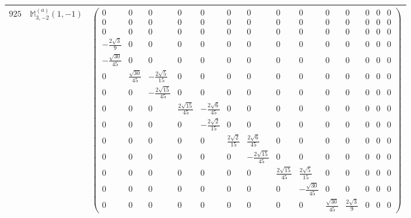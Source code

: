 \documentclass[fleqn,8pt,landscape]{jsarticle}
\begin{document}
\begin{center}
\begin{longtable}{ccc}
$ 925 $ & $ \mathbb{M}_{3,-2}^{(a)}(1,-1) $ & $ \begin{pmatrix} 0 & 0 & 0 & 0 & 0 & 0 & 0 & 0 & 0 & 0 & 0 & 0 & 0 & 0 \\ 0 & 0 & 0 & 0 & 0 & 0 & 0 & 0 & 0 & 0 & 0 & 0 & 0 & 0 \\ 0 & 0 & 0 & 0 & 0 & 0 & 0 & 0 & 0 & 0 & 0 & 0 & 0 & 0 \\ - \frac{2 \sqrt{3}}{9} & 0 & 0 & 0 & 0 & 0 & 0 & 0 & 0 & 0 & 0 & 0 & 0 & 0 \\ - \frac{\sqrt{30}}{45} & 0 & 0 & 0 & 0 & 0 & 0 & 0 & 0 & 0 & 0 & 0 & 0 & 0 \\ 0 & \frac{\sqrt{30}}{45} & - \frac{2 \sqrt{5}}{15} & 0 & 0 & 0 & 0 & 0 & 0 & 0 & 0 & 0 & 0 & 0 \\ 0 & 0 & - \frac{2 \sqrt{15}}{45} & 0 & 0 & 0 & 0 & 0 & 0 & 0 & 0 & 0 & 0 & 0 \\ 0 & 0 & 0 & \frac{2 \sqrt{15}}{45} & - \frac{2 \sqrt{6}}{45} & 0 & 0 & 0 & 0 & 0 & 0 & 0 & 0 & 0 \\ 0 & 0 & 0 & 0 & - \frac{2 \sqrt{2}}{15} & 0 & 0 & 0 & 0 & 0 & 0 & 0 & 0 & 0 \\ 0 & 0 & 0 & 0 & 0 & \frac{2 \sqrt{2}}{15} & \frac{2 \sqrt{6}}{45} & 0 & 0 & 0 & 0 & 0 & 0 & 0 \\ 0 & 0 & 0 & 0 & 0 & 0 & - \frac{2 \sqrt{15}}{45} & 0 & 0 & 0 & 0 & 0 & 0 & 0 \\ 0 & 0 & 0 & 0 & 0 & 0 & 0 & \frac{2 \sqrt{15}}{45} & \frac{2 \sqrt{5}}{15} & 0 & 0 & 0 & 0 & 0 \\ 0 & 0 & 0 & 0 & 0 & 0 & 0 & 0 & - \frac{\sqrt{30}}{45} & 0 & 0 & 0 & 0 & 0 \\ 0 & 0 & 0 & 0 & 0 & 0 & 0 & 0 & 0 & \frac{\sqrt{30}}{45} & \frac{2 \sqrt{3}}{9} & 0 & 0 & 0 \end{pmatrix} $ \\ \hline

\end{longtable}
\end{center}
\end{document}
